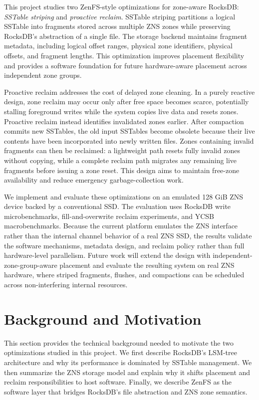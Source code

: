 \documentclass[letterpaper,twocolumn,10pt]{article}
\begin{document}
This project studies two ZenFS-style optimizations for zone-aware RocksDB: \emph{SSTable striping} and \emph{proactive reclaim}. SSTable striping partitions a logical SSTable into fragments stored across multiple ZNS zones while preserving RocksDB's abstraction of a single file. The storage backend maintains fragment metadata, including logical offset ranges, physical zone identifiers, physical offsets, and fragment lengths. This optimization improves placement flexibility and provides a software foundation for future hardware-aware placement across independent zone groups.

Proactive reclaim addresses the cost of delayed zone cleaning. In a purely reactive design, zone reclaim may occur only after free space becomes scarce, potentially stalling foreground writes while the system copies live data and resets zones. Proactive reclaim instead identifies invalidated zones earlier. After compaction commits new SSTables, the old input SSTables become obsolete because their live contents have been incorporated into newly written files. Zones containing invalid fragments can then be reclaimed: a lightweight path resets fully invalid zones without copying, while a complete reclaim path migrates any remaining live fragments before issuing a zone reset. This design aims to maintain free-zone availability and reduce emergency garbage-collection work.

We implement and evaluate these optimizations on an emulated 128 GiB ZNS device backed by a conventional SSD. The evaluation uses RocksDB write microbenchmarks, fill-and-overwrite reclaim experiments, and YCSB macrobenchmarks. Because the current platform emulates the ZNS interface rather than the internal channel behavior of a real ZNS SSD, the results validate the software mechanisms, metadata design, and reclaim policy rather than full hardware-level parallelism. Future work will extend the design with independent-zone-group-aware placement and evaluate the resulting system on real ZNS hardware, where striped fragments, flushes, and compactions can be scheduled across non-interfering internal resources.

\section{Background and Motivation}
\label{sec:background}

This section provides the technical background needed to motivate the two optimizations studied in this project. We first describe RocksDB's LSM-tree architecture and why its performance is dominated by SSTable management. We then summarize the ZNS storage model and explain why it shifts placement and reclaim responsibilities to host software. Finally, we describe ZenFS as the software layer that bridges RocksDB's file abstraction and ZNS zone semantics.
\end{document}
